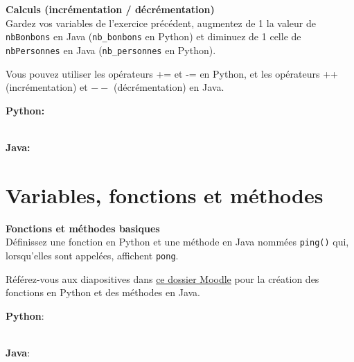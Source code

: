  \begin{Exercice} \textbf{Calculs (incrémentation / décrémentation)}\\
    Gardez vos variables de l'exercice précédent, augmentez de 1 la valeur de \lstinline|nbBonbons| en Java (\lstinline|nb_bonbons| en Python) et diminuez de 1 celle de \lstinline|nbPersonnes| en Java (\lstinline|nb_personnes| en Python).  \\
    
     \begin{conseil}
           Vous pouvez utiliser les opérateurs += et -= en Python, et les opérateurs ++ (incrémentation) et $--$ (décrémentation) en Java.
         
     \end{conseil}
     \begin{solution}
     
     \textbf{Python:}
     
     
     \textbf{\\Java:}
     
            
     \end{solution}   
 \end{Exercice}

\section{Variables, fonctions et méthodes}
\begin{Exercice} \textbf{Fonctions et méthodes basiques}\\
    Définissez une fonction en Python et une méthode en Java nommées \lstinline{ping()} qui, lorsqu'elles sont appelées, affichent \texttt{pong}. \\
     
      \begin{conseil}
        Référez-vous aux diapositives dans \href{https://moodle.unil.ch/mod/folder/view.php?id=2218936}{ce dossier Moodle} pour la création des fonctions en Python et des méthodes en Java.
      \end{conseil}
      \begin{solution}
      
          \textbf{Python}:
            
      \end{solution}
          \begin{solution}
          \textbf{\\Java}:
            
             
      \end{solution}   
  \end{Exercice}
  
